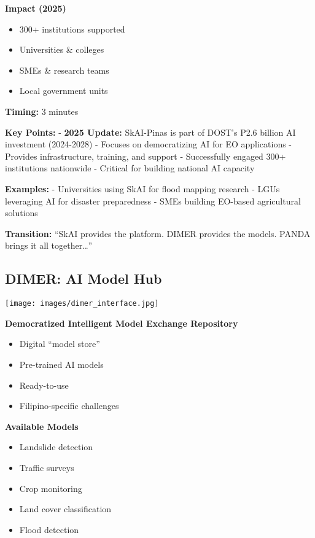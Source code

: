 \documentclass[
  letterpaper,
  DIV=11,
  numbers=noendperiod]{scrartcl}
\providecommand{\tightlist}{%
  \setlength{\itemsep}{0pt}\setlength{\parskip}{0pt}}
\begin{document}
\textbf{Impact (2025)}

\begin{itemize}
\tightlist
\item
  300+ institutions supported
\item
  Universities \& colleges
\item
  SMEs \& research teams
\item
  Local government units
\end{itemize}

\textbf{Timing:} 3 minutes

\textbf{Key Points:} - \textbf{2025 Update:} SkAI-Pinas is part of
DOST's P2.6 billion AI investment (2024-2028) - Focuses on democratizing
AI for EO applications - Provides infrastructure, training, and support
- Successfully engaged 300+ institutions nationwide - Critical for
building national AI capacity

\textbf{Examples:} - Universities using SkAI for flood mapping research
- LGUs leveraging AI for disaster preparedness - SMEs building EO-based
agricultural solutions

\textbf{Transition:} ``SkAI provides the platform. DIMER provides the
models. PANDA brings it all together\ldots{}''

\subsection{DIMER: AI Model Hub}\label{dimer-ai-model-hub}

\begin{center}
\texttt{[image: images/dimer\_interface.jpg]}
\end{center}

\textbf{Democratized Intelligent Model Exchange Repository}

\begin{itemize}
\tightlist
\item
  Digital ``model store''
\item
  Pre-trained AI models
\item
  Ready-to-use
\item
  Filipino-specific challenges
\end{itemize}

\textbf{Available Models}

\begin{itemize}
\tightlist
\item
  Landslide detection
\item
  Traffic surveys
\item
  Crop monitoring
\item
  Land cover classification
\item
  Flood detection
\end{itemize}
\end{document}
